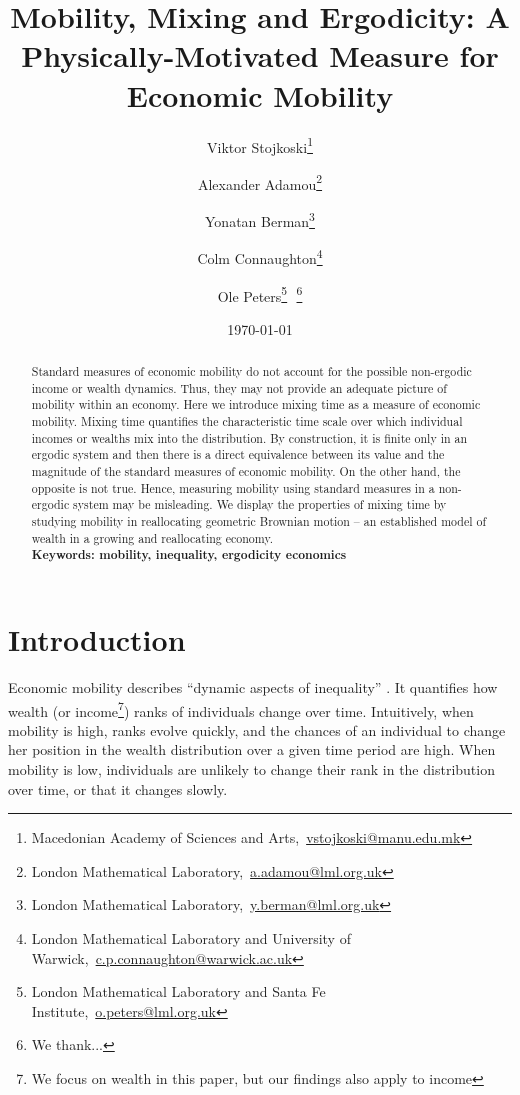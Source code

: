 \documentclass[11pt]{article}
\newcommand{\bc}{\begin{center}}
\newcommand{\ec}{\end{center}}
\newcommand{\red}[1]{{\color{red} #1}}
\numberwithin{equation}{section}
\begin{document}
\begin{titlepage}
\title{Mobility, Mixing and Ergodicity: A Physically-Motivated Measure for Economic Mobility}
\author{Viktor Stojkoski\footnote{Macedonian Academy of Sciences and Arts,~\url{vstojkoski@manu.edu.mk}} \and Alexander Adamou\footnote{London Mathematical Laboratory,~\url{a.adamou@lml.org.uk}} \and Yonatan Berman\footnote{London Mathematical Laboratory,~\url{y.berman@lml.org.uk}} \and Colm Connaughton\footnote{London Mathematical Laboratory and University of Warwick,~\url{c.p.connaughton@warwick.ac.uk}} \and Ole Peters\footnote{London Mathematical Laboratory and Santa Fe Institute,~\url{o.peters@lml.org.uk}}\,\, \thanks{We thank...}}
\date{\today}
\maketitle
\begin{abstract}
\noindent Standard measures of economic mobility do not account for the possible non-ergodic income or wealth dynamics. Thus, they may not provide an adequate picture of mobility within an economy. Here we introduce mixing time as a measure of economic mobility. Mixing time quantifies the characteristic time scale over which individual incomes or wealths mix into the distribution. By construction, it is finite only in an ergodic system and then there is a direct equivalence between its value and the magnitude of the standard measures of economic mobility. On the other hand, the opposite is not true. Hence, measuring mobility using standard measures in a non-ergodic system may be misleading. We display the properties of mixing time by studying mobility in reallocating geometric Brownian motion -- an established model of wealth in a growing and reallocating economy.
\\

\noindent\textbf{Keywords: mobility, inequality, ergodicity economics}
\end{abstract}
\setcounter{page}{0}
\thispagestyle{empty}
\end{titlepage}
\pagebreak \newpage
\section{Introduction}\label{sec:introduction}
Economic mobility describes ``dynamic aspects of inequality'' \citep{Shorrocks1978}. It quantifies how wealth (or income\footnote{We focus on wealth in this paper, but our findings also apply to income}) ranks of individuals change over time. Intuitively, when mobility is high, ranks evolve quickly, and the chances of an individual to change her position in the wealth distribution over a given time period are high. When mobility is low, individuals are unlikely to change their rank in the distribution over time, or that it changes slowly.
\end{document}
